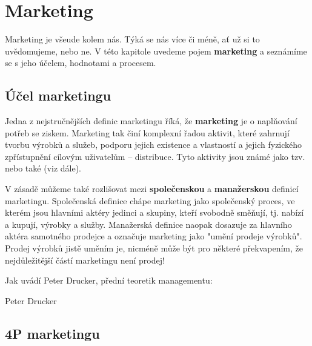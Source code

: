 \chapter{Marketing}\label{ch:marketing}

Marketing je všeude kolem nás. Týká se nás více či méně, ať už si to uvědomujeme, nebo ne. V této kapitole uvedeme pojem \textbf{marketing} a seznámíme se s jeho účelem, hodnotami a procesem.

\section{Účel marketingu}

Jedna z nejstručnějších definic marketingu říká, že \textbf{marketing} je o naplňování potřeb se ziskem.\cite{kotler2007marketingmanagement} Marketing tak činí komplexní řadou aktivit, které zahrnují tvorbu výrobků a služeb, podporu jejich existence a vlastností a jejich fyzického zpřístupnění cílovým uživatelům -- distribuce.\cite{clemente2004slovnikmarketingu}
Tyto aktivity jsou známé jako tzv. \textbf{} nebo také \textbf{} (viz dále).

V zásadě můžeme také rozlišovat mezi \textbf{společenskou} a \textbf{manažerskou} definicí marketingu. Společenská definice chápe marketing jako společenský proces, ve kterém jsou hlavními aktéry jedinci a skupiny, kteří svobodně směňují, tj. nabízí a kupují, výrobky a služby. Manažerská definice naopak dosazuje za hlavního aktéra samotného prodejce a označuje marketing jako "umění prodeje výrobků"\cite{kotler2007marketingmanagement}.
Prodej výrobků jistě uměním je, nicméně může být pro některé překvapením, že nejdůležitější částí marketingu není prodej!

Jak uvádí Peter Drucker, přední teoretik managementu\cite{kotler2007marketingmanagement}:
\begin{aquote}{Peter Drucker}
\end{aquote}

\section{4P marketingu}

